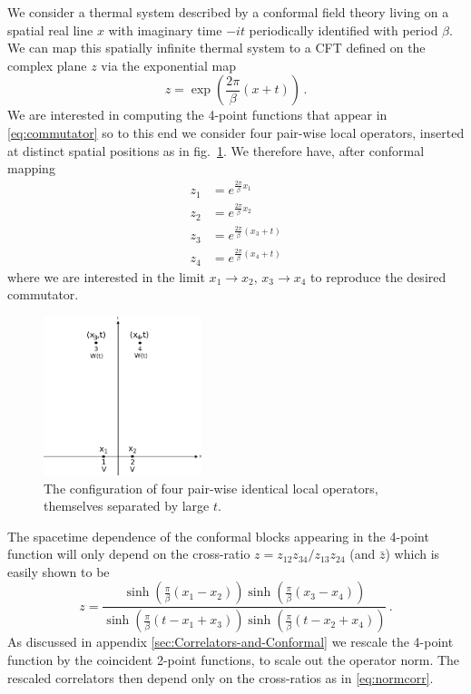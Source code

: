 \documentclass{brownthesis}
\begin{document}
We consider a thermal system described by a conformal field theory
living on a spatial real line $x$ with imaginary time $-it$ periodically
identified with period $\beta$. We can map this spatially infinite
thermal system to a CFT defined on the complex plane $z$ via the
exponential map
\[
z=\exp\left(\frac{2\pi}{\beta}(x+t)\right)\,.
\]
We are interested in computing the 4-point functions that appear in
\eqref{eq:commutator} so to this end we consider four pair-wise local
operators, inserted at distinct spatial positions as in fig.~\ref{fig:localops}.
We therefore have, after conformal mapping
\[
\begin{aligned}z_{1} & =e^{\frac{2\pi}{\beta}x_{1}}\\
z_{2} & =e^{\frac{2\pi}{\beta}x_{2}}\\
z_{3} & =e^{\frac{2\pi}{\beta}(x_{3}+t)}\\
z_{4} & =e^{\frac{2\pi}{\beta}(x_{4}+t)}
\end{aligned}
\]
where we are interested in the limit $x_{1}\to x_{2},\,x_{3}\to x_{4}$
to reproduce the desired commutator.
\begin{figure}
\centering\includegraphics[width=0.41\textwidth]{localops} \caption{\label{fig:localops}The configuration of four pair-wise identical
local operators, themselves separated by large $t$.}
\end{figure}

The spacetime dependence of the conformal blocks appearing in the
4-point function will only depend on the cross-ratio $z=z_{12}z_{34}/z_{13}z_{24}$
(and $\bar{z}$) which is easily shown to be
\[
z=\frac{\sinh\left(\frac{\pi}{\beta}(x_{1}-x_{2})\right)\sinh\left(\frac{\pi}{\beta}(x_{3}-x_{4})\right)}{\sinh\left(\frac{\pi}{\beta}(t-x_{1}+x_{3})\right)\sinh\left(\frac{\pi}{\beta}(t-x_{2}+x_{4})\right)}\,.
\]
As discussed in appendix \ref{sec:Correlators-and-Conformal} we rescale
the 4-point function by the coincident 2-point functions, to scale
out the operator norm. The rescaled correlators then depend only on
the cross-ratios as in \eqref{eq:normcorr}.
\end{document}
